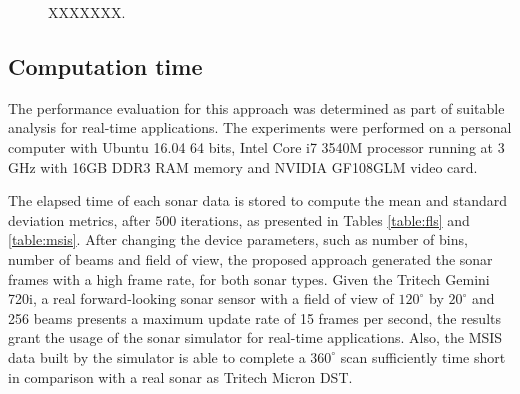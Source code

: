 \documentclass[final,5p,times]{elsarticle}
\begin{document}
\begin{figure}[ht]
{    }
    \captionsetup{justification=centering}
    \caption{XXXXXXX.}
    \label{fig:msis:1}
\end{figure}

\subsection{Computation time}

The performance evaluation for this approach was determined as part of suitable analysis for real-time applications. The experiments were performed on a personal computer with Ubuntu 16.04 64 bits, Intel Core i7 3540M processor running at 3 GHz with 16GB DDR3 RAM memory and NVIDIA GF108GLM video card.

The elapsed time of each sonar data is stored to compute the mean and standard deviation metrics, after $500$ iterations, as presented in Tables \ref{table:fls} and \ref{table:msis}. After changing the device parameters, such as number of bins, number of beams and field of view, the proposed approach generated the sonar frames with a high frame rate, for both sonar types. Given the Tritech Gemini 720i, a real forward-looking sonar sensor with a field of view of $120^{\circ}$ by $20^{\circ}$ and 256 beams presents a maximum update rate of 15 frames per second, the results grant the usage of the sonar simulator for real-time applications. Also, the MSIS data built by the simulator is able to complete a $360^{\circ}$ scan sufficiently time short in comparison with a real sonar as Tritech Micron DST.
\end{document}
